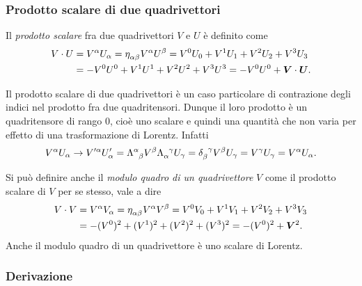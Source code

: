 \subsubsection{Prodotto scalare di due quadrivettori}
\label{sec:prodotto-scalare-quadrivettori}

Il \emph{prodotto scalare} fra due quadrivettori $V$ e $U$ è definito come
\begin{equation}
  \begin{split}
    V\cdot U &= V^{\alpha}U_{\alpha} =
    \tensor{\eta}{_{\alpha\beta}}V^{\alpha}U^{\beta} = V^{0}U_{0} + V^{1}U_{1} +
    V^{2}U_{2} + V^{3}U_{3} \\
    &= -V^{0}U^{0} + V^{1}U^{1} + V^{2}U^{2} + V^{3}U^{3} = -V^{0}U^{0} +
    \bm{V}\cdot\bm{U}.
  \end{split}
\end{equation}

Il prodotto scalare di due quadrivettori è un caso particolare di contrazione
degli indici nel prodotto fra due quadritensori.  Dunque il loro prodotto è un
quadritensore di rango $0$, cioè uno scalare e quindi una quantità che non varia
per effetto di una trasformazione di Lorentz.  Infatti
\begin{equation}
  V^{\alpha}U_{\alpha} \to V'^{\alpha}U'_{\alpha} =
  \tensor{\Lambda}{^{\alpha}_{\beta}} V^{\beta}
  \tensor{\Lambda}{_{\alpha}^{\gamma}} U_{\gamma} =
  \tensor{\delta}{_{\beta}^{\gamma}} V^{\beta} U_{\gamma} = V^{\gamma}U_{\gamma}
  = V^{\alpha} U_{\alpha}.
\end{equation}

Si può definire anche il \emph{modulo
  quadro di un quadrivettore}
$V$ come il prodotto scalare di $V$ per se stesso, vale a dire
\begin{equation}
  \begin{split}
    V\cdot V &= V^{\alpha}V_{\alpha} =
    \tensor{\eta}{_{\alpha\beta}}V^{\alpha}V^{\beta} = V^{0}V_{0} + V^{1}V_{1} +
    V^{2}V_{2} + V^{3}V_{3} \\
    &= -(V^{0})^{2} + (V^{1})^{2} + (V^{2})^{2} + (V^{3})^{2} = -(V^{0})^{2} +
    \bm{V}^{2}.
  \end{split}
\end{equation}
Anche il modulo quadro di un quadrivettore è uno scalare di Lorentz.

\subsubsection{Derivazione}
\label{sec:derivazione}

